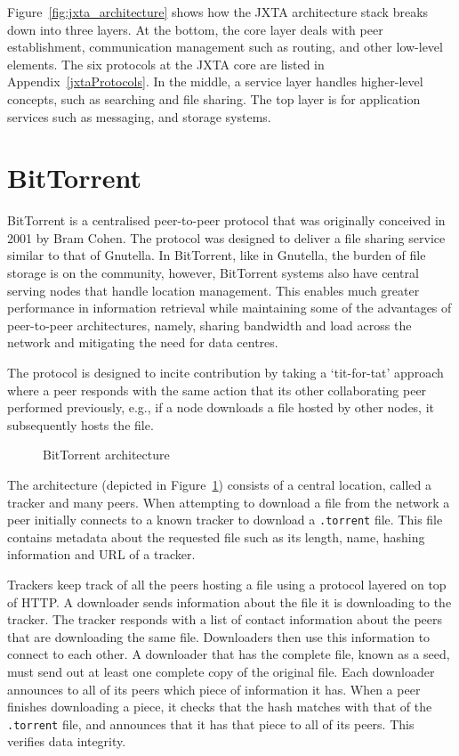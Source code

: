 Figure~\ref{fig:jxta_architecture} shows how the JXTA architecture stack breaks down into three layers. At the bottom, the core layer deals with peer establishment, communication management such as routing, and other low-level elements. The six protocols at the JXTA core are listed in Appendix~\ref{jxtaProtocols}. In the middle, a service layer handles higher-level concepts, such as searching and file sharing. The top layer is for application services such as messaging, and storage systems.



\section{BitTorrent}
\label{sec:bittorrent}

BitTorrent\cite{cohen2008bittorrent} is a centralised peer-to-peer protocol that was originally conceived in 2001 by Bram Cohen. The protocol was designed to deliver a file sharing service similar to that of Gnutella. In BitTorrent, like in Gnutella, the burden of file storage is on the community, however, BitTorrent systems also have central serving nodes that handle location management. This enables much greater performance in information retrieval while maintaining some of the advantages of peer-to-peer architectures, namely, sharing bandwidth and load across the network and mitigating the need for data centres\cite{lua2005survey}.

The protocol is designed to incite contribution by taking a `tit-for-tat' approach where a peer responds with the same action that its other collaborating peer performed previously, e.g., if a node downloads a file hosted by other nodes, it subsequently hosts the file.

\begin{figure}[ht]
    \centering
    
    \caption{BitTorrent architecture}
    \label{fig:bittorentArchitecture}
\end{figure}

The architecture (depicted in Figure~\ref{fig:bittorentArchitecture}) consists of a central location, called a tracker and many peers. When attempting to download a file from the network a peer initially connects to a known tracker to download a \verb+.torrent+ file. This file contains metadata about the requested file such as its length, name, hashing information and URL of a tracker.

Trackers keep track of all the peers hosting a file using a protocol layered on top of HTTP. A downloader sends information about the file it is downloading to the tracker. The tracker responds with a list of contact information about the peers that are downloading the same file. Downloaders then use this information to connect to each other. A downloader that has the complete file, known as a seed, must send out at least one complete copy of the original file. Each downloader announces to all of its peers which piece of information it has. When a peer finishes downloading a piece, it checks that the hash matches with that of the \verb+.torrent+ file, and announces that it has that piece to all of its peers. This verifies data integrity.

